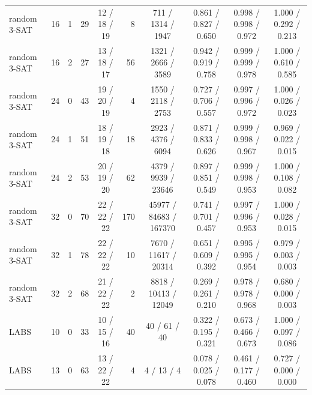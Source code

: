 \begin{tabular}{lrr r c r c c c c}
random 3-SAT & 16 & 1 & 29 & 12 / 18 / 19 & 8 & 711 / 1314 / 1947 & 0.861 / 0.827 / 0.650 & 0.998 / 0.998 / 0.972 & 1.000 / 0.292 / 0.213 \\
random 3-SAT & 16 & 2 & 27 & 13 / 18 / 17 & 56 & 1321 / 2666 / 3589 & 0.942 / 0.919 / 0.758 & 0.999 / 0.999 / 0.978 & 1.000 / 0.610 / 0.585 \\
random 3-SAT & 24 & 0 & 43 & 19 / 20 / 19 & 4 & 1550 / 2118 / 2753 & 0.727 / 0.706 / 0.557 & 0.997 / 0.996 / 0.972 & 1.000 / 0.026 / 0.023 \\
random 3-SAT & 24 & 1 & 51 & 18 / 19 / 18 & 18 & 2923 / 4376 / 6094 & 0.871 / 0.833 / 0.626 & 0.999 / 0.998 / 0.967 & 0.969 / 0.022 / 0.015 \\
random 3-SAT & 24 & 2 & 53 & 20 / 19 / 20 & 62 & 4379 / 9939 / 23646 & 0.897 / 0.851 / 0.549 & 0.999 / 0.998 / 0.953 & 1.000 / 0.108 / 0.082 \\
random 3-SAT & 32 & 0 & 70 & 22 / 22 / 22 & 170 & 45977 / 84683 / 167370 & 0.741 / 0.701 / 0.457 & 0.997 / 0.996 / 0.953 & 1.000 / 0.028 / 0.015 \\
random 3-SAT & 32 & 1 & 78 & 22 / 22 / 22 & 10 & 7670 / 11617 / 20314 & 0.651 / 0.609 / 0.392 & 0.995 / 0.995 / 0.954 & 0.979 / 0.003 / 0.003 \\
random 3-SAT & 32 & 2 & 68 & 21 / 22 / 22 & 2 & 8818 / 10413 / 12049 & 0.269 / 0.261 / 0.210 & 0.978 / 0.978 / 0.968 & 0.680 / 0.000 / 0.003 \\
LABS & 10 & 0 & 33 & 10 / 15 / 16 & 40 & 40 / 61 / 40 & 0.322 / 0.195 / 0.321 & 0.673 / 0.466 / 0.673 & 1.000 / 0.097 / 0.086 \\
LABS & 13 & 0 & 63 & 13 / 22 / 22 & 4 & 4 / 13 / 4 & 0.078 / 0.025 / 0.078 & 0.461 / 0.177 / 0.460 & 0.727 / 0.000 / 0.000 \\
\bottomrule
\end{tabular}